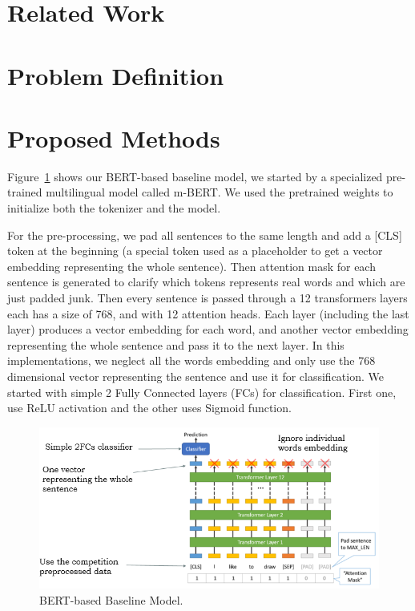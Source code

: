 \documentclass[10pt,twocolumn,letterpaper]{article}
\begin{document}
\section{Related Work}
\section{Problem Definition}
\section{Proposed Methods}
Figure~\ref{BERTbasedModel} shows our BERT-based\cite{devlin2018bert} baseline model, we started by a specialized pre-trained multilingual model called m-BERT. We used the pretrained weights to initialize both the tokenizer and the model.

For the pre-processing, we pad all sentences to the same length and add a [CLS] token at the beginning (a special token used as a placeholder to get a vector embedding representing the whole sentence). Then attention mask for each sentence is generated to clarify which tokens represents real words and which are just padded junk. Then every sentence is passed through a 12 transformers layers each has a size of 768, and with 12 attention heads. Each layer (including the last layer) produces a vector embedding for each word, and another vector embedding representing the whole sentence and pass it to the next layer. In this implementations, we neglect all the words embedding and only use the 768 dimensional vector representing the sentence and use it for classification. We started with simple 2 Fully Connected layers (FCs) for classification. First one, use ReLU activation and the other uses Sigmoid function. 

\begin{figure}[htbp]
\centerline{\includegraphics[width=0.999\columnwidth]{Figures/BERTbasedModel.png}}
\caption{BERT-based Baseline Model.}
\label{BERTbasedModel}
\end{figure}
\end{document}
